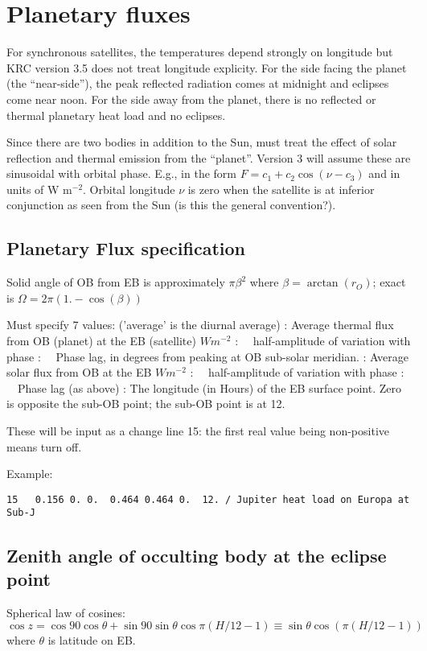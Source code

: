 \documentclass{article}
\begin{document}
\section{Planetary fluxes}

For synchronous satellites, the temperatures depend strongly on longitude but
KRC version 3.5 does not treat longitude explicity.  For the side facing the
planet (the ``near-side''), the peak reflected radiation comes at midnight and
eclipses come near noon. For the side away from the planet, there is no
reflected or thermal planetary heat load and no eclipses.

Since there are two bodies in addition to the Sun, must treat the effect of
solar reflection and thermal emission from the ``planet''.  Version 3 will
assume these are sinusoidal with orbital phase.  E.g., in the form $F=c_1 + c_2
\cos (\nu -c_3)$ and in units of W m$^{-2}$. Orbital longitude $\nu$ is zero
when the satellite is at inferior conjunction as seen from the Sun (is this the
general convention?).

\subsection{Planetary Flux specification \label{pline}}
 Solid angle of OB from EB is approximately $\pi \beta^2$ 
where $\beta = \arctan(r_O)$; exact is $\Omega=2 \pi (1.- \cos(\beta))$

Must specify 7 values: ('average' is the diurnal average)
: Average thermal flux from OB (planet) at the EB (satellite) $W m^{-2}$
: \ \ half-amplitude of variation with phase
: \  \ Phase lag, in degrees from peaking at OB sub-solar meridian. 
: Average solar flux from OB at the EB $W m^{-2}$
:  \ \ half-amplitude of variation with phase
:  \ \ Phase lag (as above)
: The longitude (in Hours) of the EB surface point.
\qiii  Zero is opposite the sub-OB point; the sub-OB point is at 12.
 
These will be input as a change line 15: the first real value being non-positive
means turn off.  

Example: \vspace{-3.mm} 
\begin{verbatim}
15   0.156 0. 0.  0.464 0.464 0.  12. / Jupiter heat load on Europa at Sub-J
\end{verbatim}

\subsection{Zenith angle of occulting body at the eclipse point}  
Spherical law of cosines: \ 
$ \cos z = \cos 90 \cos \theta + \sin 90 \sin \theta \cos \pi (H/12-1) \equiv 
  \sin \theta \cos (\pi (H/12-1)) $ 
\qi where $\theta$ is latitude on EB.
\end{document}
